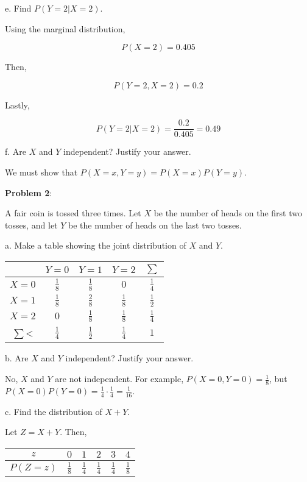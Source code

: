 \documentclass{article}
\begin{document}
\indent e. Find $P(Y=2|X=2)$.

{\color{blue}

Using the marginal distribution, 

$$P(X=2)=0.405$$

Then, 

$$P(Y=2,X=2)=0.2$$

Lastly,

$$P(Y=2|X=2)=\frac{0.2}{0.405}=0.49$$

}

\indent f. Are $X$ and $Y$ independent? Justify your answer.

We must show that $P(X=x,Y=y)=P(X=x)P(Y=y)$.

\noindent\textbf{Problem 2}: 

A fair coin is tossed three times. Let $X$ be the number of heads on the first two tosses, and let $Y$ be the number of heads on the last two tosses.

\indent\indent a. Make a table showing the joint distribution of $X$ and $Y$.

{\color{blue}

\begin{center}
    \begin{tabular} { |c|c|c|c||c|}
        \hline
        &$Y=0$&$Y=1$&$Y=2$&$\sum$\\
        \hline
        $X=0$&$\frac{1}{8}$&$\frac{1}{8}$&$0$&$\frac{1}{4}$\\
        \hline
        $X=1$&$\frac{1}{8}$&$\frac{2}{8}$&$\frac{1}{8}$&$\frac{1}{2}$\\
        \hline
        $X=2$&$0$&$\frac{1}{8}$&$\frac{1}{8}$&$\frac{1}{4}$\\
        \hline
        \hline
        $\sum$<&$\frac{1}{4}$&$\frac{1}{2}$&$\frac{1}{4}$&$1$\\
        \hline
    \end{tabular}
\end{center}

}

\indent\indent b. Are $X$ and $Y$ independent? Justify your answer.

{\color{blue}

No, $X$ and $Y$ are not independent. For example, $P(X=0,Y=0)=\frac{1}{8}$, but $P(X=0)P(Y=0)=\frac{1}{4}\cdot\frac{1}{4}=\frac{1}{16}$.

}

\indent\indent c. Find the distribution of $X+Y$.

{\color{blue}

Let $Z=X+Y$. Then,

\begin{center}
    \begin{tabular} { |c|c|c|c|c|c|}
        \hline
        $z$&$0$&$1$&$2$&$3$&$4$\\
        \hline
        $P(Z=z)$&$\frac{1}{8}$&$\frac{1}{4}$&$\frac{1}{4}$&$\frac{1}{4}$&$\frac{1}{8}$\\
        \hline
    \end{tabular}
\end{center}

}
\end{document}
